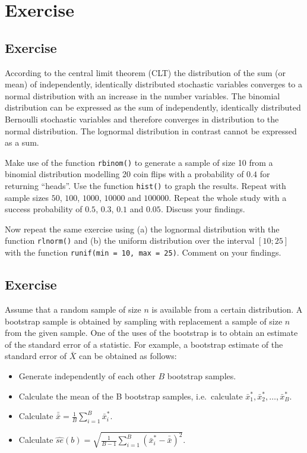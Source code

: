 \documentclass[
]{book}
\providecommand{\tightlist}{%
  \setlength{\itemsep}{0pt}\setlength{\parskip}{0pt}}
\begin{document}
\section{Exercise}\label{exercise-3}

\subsection{Exercise}\label{exercise-4}

According to the central limit theorem (CLT) the distribution of the sum (or mean) of independently, identically distributed stochastic variables converges to a normal distribution with an increase in the number variables. The binomial distribution can be expressed as the sum of independently, identically distributed Bernoulli stochastic variables and therefore converges in distribution to the normal distribution. The lognormal distribution in contrast cannot be expressed as a sum.

Make use of the function \texttt{rbinom()} to generate a sample of size 10 from a binomial distribution modelling 20 coin flips with a probability of \(0.4\) for returning ``heads''. Use the function \texttt{hist()} to graph the results. Repeat with sample sizes \(50\), \(100\), \(1000\), \(10000\) and \(100000\).
Repeat the whole study with a success probability of \(0.5\), \(0.3\), \(0.1\) and \(0.05\). Discuss your findings.

Now repeat the same exercise using (a) the lognormal distribution with the function \texttt{rlnorm()} and (b) the uniform distribution over the interval \([10; 25]\) with the function \texttt{runif(min\ =\ 10,\ max\ =\ 25)}. Comment on your findings.

\subsection{Exercise}\label{exercise-5}

Assume that a random sample of size \(n\) is available from a certain distribution. A bootstrap sample is obtained by sampling with replacement a sample of size \(n\) from the given sample. One of the uses of the bootstrap is to obtain an estimate of the standard error of a statistic. For example, a bootstrap estimate of the standard error of \(\bar{X}\) can be obtained as follows:

\begin{itemize}
\tightlist
\item
  Generate independently of each other \(B\) bootstrap samples.
\item
  Calculate the mean of the B bootstrap samples, i.e.~calculate \(\bar{x}_1^*, \bar{x}_2^*, \dots, \bar{x}_B^*\).
\item
  Calculate \(\bar{\bar{x}} = \frac{1}{B} \sum_{i=1}^{B}{\bar{x}_i^*}\).
\item
  Calculate \(\hat{se}(b) = \sqrt{\frac{1}{B-1} \sum_{i=1}^{B}{(\bar{x}_i^*-\bar{\bar{x}})^2}}\).
\end{itemize}
\end{document}
